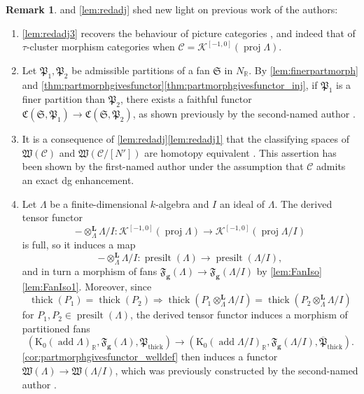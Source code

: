 \documentclass[10pt,twoside, a4paper,reqno]{amsart}
\DeclareMathOperator{\presilt}{presilt}
\DeclareMathOperator{\add}{add}
\DeclareMathOperator{\thick}{thick}
\DeclareMathOperator{\proj}{proj}
\newcommand{\Ktwo}{\mathcal{K}^{[-1,0]}}
\newcommand{\partfan}[1]{\mathfrak{F}_{\bfg}(#1)}
\newcommand{\catof}{\mathfrak{C}}
\newcommand{\derotimes}[1]{\otimes_{#1}^{\mathbf{L}}}
\newcommand{\Wfrak}{\mathfrak{W}}
\newcommand{\Pfrak}{\mathfrak{P}}
\newcommand{\R}{\mathbb{R}}
\newcommand{\calC}{\mathcal{C}}
\newcommand{\K}{\mathrm{K}}
\newcommand{\bfg}{\mathbf{g}}
\newcommand{\Sfan}{\mathfrak{S}}
\theoremstyle{definition}
\newtheorem{remark}[theorem]{Remark}
\begin{document}
\begin{remark}\label{rem:generlises}
 and \cref{lem:redadj} shed new light on previous work of the authors:
    \begin{enumerate}
        \item\label{eg:partmorphgivesfunctor_red}
    \eqref{lem:redadj3} recovers the behaviour of picture categories \cite[§6]{Bor24}, and indeed that of $\tau$-cluster morphism categories \cite[{Prop.} 6.14]{BH21} when $\calC = \Ktwo(\proj \Lambda)$.
        \item\label{rem:generlises_Kai23} Let $\Pfrak_1, \Pfrak_2$ be admissible partitions of a fan $\Sfan$ in $N_\R$. By \cref{lem:finerpartmorph} and \cref{thm:partmorphgivesfunctor}\eqref{thm:partmorphgivesfunctor_inj}, if $\Pfrak_1$ is a finer partition than $\Pfrak_2$, there exists a faithful functor $\catof(\Sfan, \Pfrak_1) \to \catof(\Sfan, \Pfrak_2)$, as shown previously by the second-named author \cite[Thm. 1.3(1)]{Kai23}.
        \item\label{rem:generlises_Bor24} 
        It is a consequence of \cref{lem:redadj}\eqref{lem:redadj1} that the classifying spaces of $\Wfrak(\calC)$ and $\Wfrak(\calC/[N'])$ are homotopy equivalent \cite[Corollary 1 in §1]{Qui73}. This assertion has been shown by the first-named author \cite[{Prop.} 6.6]{Bor24} under the assumption that $\calC$ admits an exact dg enhancement.
     
     \item\label{rem:generlises_Kai24} Let $\Lambda$ be a finite-dimensional $k$-algebra and $I$ an ideal of $\Lambda$.
     The derived tensor functor
     \begin{equation*}
         -\derotimes{\Lambda} \Lambda/I \colon \Ktwo(\proj \Lambda) \xrightarrow{} \Ktwo(\proj \Lambda/I)
     \end{equation*}
     is full, so it induces a map 
     \begin{equation*}
         -\derotimes{\Lambda} \Lambda/I \colon \presilt(\Lambda) \xrightarrow{} \presilt(\Lambda/I),
     \end{equation*}
     and in turn a morphism of fans 
    $
        \partfan{\Lambda} \xrightarrow{} \partfan{\Lambda/I}
    $
    {by \cref{lem:FanIso}\eqref{lem:FanIso1}}. Moreover, since
     \begin{equation*}
        \thick(P_1) = \thick(P_2) \Longrightarrow \thick(P_1\derotimes{\Lambda} \Lambda/I) = \thick(P_2\derotimes{\Lambda} \Lambda/I) 
    \end{equation*}
    for $P_1,P_2\in \presilt(\Lambda)$, the derived tensor functor induces a morphism of partitioned fans
    \begin{equation*}
        (\K_0(\add \Lambda)_\R, \partfan{\Lambda}, \Pfrak_{\thick}) \xrightarrow{} (\K_0(\add \Lambda/I)_\R, \partfan{\Lambda/I}, \overline{\Pfrak}_{\thick}).
    \end{equation*} \eqref{cor:partmorphgivesfunctor_welldef} then induces a functor $\Wfrak(\Lambda)\xrightarrow{}\Wfrak(\Lambda/I)$, which was previously constructed by the second-named author \cite[{Thm.} 1.3]{Kai24}. 
    \end{enumerate}
\end{remark}
\end{document}
